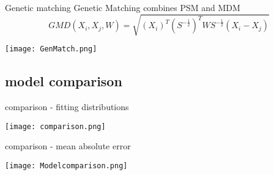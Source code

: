 \documentclass[aspectratio=169]{beamer}
\begin{document}
		\begin{frame}{Genetic matching}
			Genetic Matching combines PSM and MDM
			\begin{equation}
				GMD(X_i, X_j, W) = \sqrt{(X_i)^T(S^{-\frac{1}{2}})^TWS^{-\frac{1}{2}}(X_i-X_j)}
			\end{equation}
			\begin{center}
				\texttt{[image: GenMatch.png]}
			\end{center}
		\end{frame}

	\subsection{model comparison}
		\begin{frame}{comparison - fitting distributions}
			\begin{center}
				\texttt{[image: comparison.png]}
			\end{center}
		\end{frame}

		\begin{frame}{comparison - mean absolute error}
			\begin{center}
				\texttt{[image: Modelcomparison.png]}
			\end{center}
		\end{frame}
\end{document}
